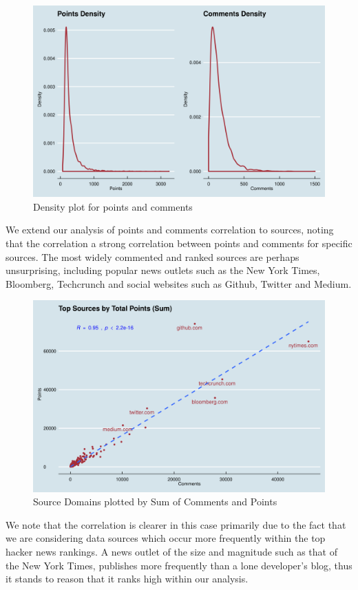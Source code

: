 \documentclass[11pt,journal,final,a4paper]{IEEEtran}
\begin{document}
\begin{figure}[!ht]
\centerline{\includegraphics[scale=0.4]{img/descriptive_03_var_density.png}}
\caption{Density plot for points and comments}
\label{fig3}
\end{figure}

We extend our analysis of points and comments correlation to sources, noting that the correlation a strong correlation between points and comments for specific sources. The most widely commented and ranked sources are perhaps unsurprising, including popular news outlets such as the New York Times, Bloomberg, Techcrunch and social websites such as Github, Twitter and Medium. 
\begin{figure}[!ht]
\centerline{\includegraphics[scale=0.4]{img/descriptive_04_source_sum.png}}
\caption{Source Domains plotted by Sum of Comments and Points}
\label{fig4}
\end{figure}
We note that the correlation is clearer in this case primarily due to the fact that we are considering data sources which occur more frequently within the top hacker news rankings. A news outlet of the size and magnitude such as that of the New York Times, publishes more frequently than a lone developer's blog, thus it stands to reason that it ranks high within our analysis. 
\end{document}
